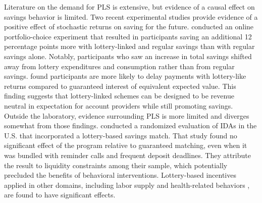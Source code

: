 \documentclass[12pt]{article}
\begin{document}
	Literature on the demand for PLS is extensive, but evidence of a causal effect on savings behavior is limited. Two recent experimental studies provide evidence of a positive effect of stochastic returns on saving for the future.  conducted an online portfolio-choice experiment that resulted in participants saving an additional 12 percentage points more with lottery-linked and regular savings than with regular savings alone. Notably, participants who saw an increase in total savings shifted away from lottery expenditures and consumption rather than from regular savings.  found participants are more likely to delay payments with lottery-like returns compared to guaranteed interest of equivalent expected value. This finding suggests that lottery-linked schemes can be designed to be revenue neutral in expectation for account providers while still promoting savings. Outside the laboratory, evidence surrounding PLS is more limited and diverges somewhat from those findings.  conducted a randomized evaluation of IDAs in the U.S. that incorporated a lottery-based savings match. That study found no significant effect of the program relative to guaranteed matching, even when it was bundled with reminder calls and frequent deposit deadlines. They attribute the result to liquidity constraints among their sample, which potentially precluded the benefits of behavioral interventions. Lottery-based incentives applied in other domains, including labor supply  and health-related behaviors , are found to have significant effects.


\end{document}
